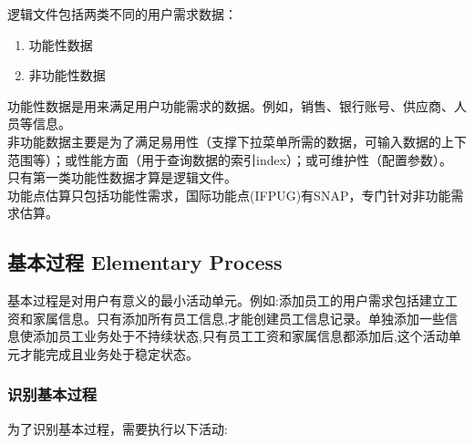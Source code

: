 逻辑文件包括两类不同的用户需求数据：

\begin{enumerate}
\tightlist
\item
  功能性数据
\item
  非功能性数据
\end{enumerate}

功能性数据是用来满足用户功能需求的数据。例如，销售、银行账号、供应商、人员等信息。\\
非功能数据主要是为了满足易用性（支撑下拉菜单所需的数据，可输入数据的上下范围等）；或性能方面（用于查询数据的索引index）；或可维护性（配置参数）。\\
只有第一类功能性数据才算是逻辑文件。\\

功能点估算只包括功能性需求，国际功能点(IFPUG)有SNAP，专门针对非功能需求估算。\\

\hypertarget{ux57faux672cux8fc7ux7a0b-elementary-process}{%
\subsection{基本过程 Elementary
Process}\label{ux57faux672cux8fc7ux7a0b-elementary-process}}

基本过程是对用户有意义的最小活动单元。例如:添加员工的用户需求包括建立工资和家属信息。只有添加所有员工信息,才能创建员工信息记录。单独添加一些信息使添加员工业务处于不持续状态,只有员工工资和家属信息都添加后,这个活动单元才能完成且业务处于稳定状态。

\hypertarget{ux8bc6ux522bux57faux672cux8fc7ux7a0b}{%
\subsubsection{识别基本过程}\label{ux8bc6ux522bux57faux672cux8fc7ux7a0b}}

为了识别基本过程，需要执行以下活动:

